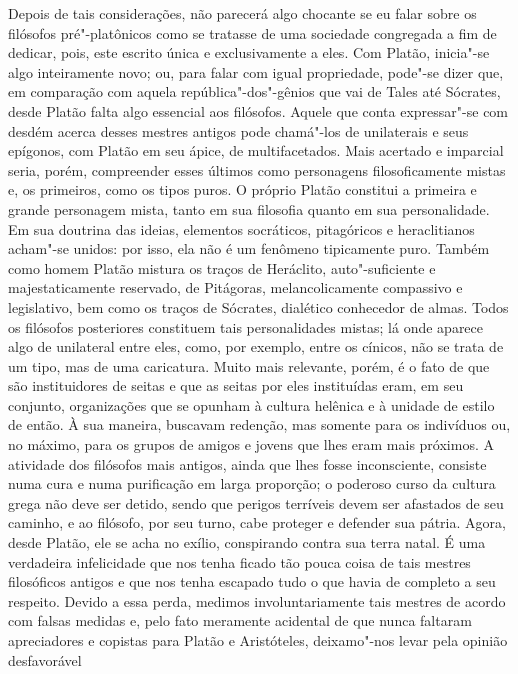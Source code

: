 Depois de tais considerações, não parecerá algo chocante se eu falar
sobre os filósofos pré"-platônicos como se tratasse de uma sociedade
congregada a fim de dedicar, pois, este escrito única e exclusivamente
a eles. Com Platão, inicia"-se algo inteiramente novo; ou, para falar \label{complatao}
com igual propriedade, pode"-se dizer que, em comparação com aquela
república"-dos"-gênios que vai de Tales até Sócrates, desde Platão falta
algo essencial aos filósofos. Aquele que conta expressar"-se com desdém
acerca desses mestres antigos pode chamá"-los de unilaterais e seus
epígonos, com Platão em seu ápice, de multifacetados. Mais acertado e
imparcial seria, porém, compreender esses últimos como personagens
filosoficamente mistas e, os primeiros, como os tipos puros. O próprio
Platão constitui a primeira e grande personagem mista, tanto em sua
filosofia quanto em sua personalidade. Em sua doutrina das ideias,
elementos socráticos, pitagóricos e heraclitianos acham"-se unidos: por
isso, ela não é um fenômeno tipicamente puro. Também como homem Platão
mistura os traços de Heráclito, auto"-suficiente e majestaticamente
reservado, de Pitágoras, melancolicamente compassivo e legislativo, bem
como os traços de Sócrates, dialético conhecedor de almas. Todos os
filósofos posteriores constituem tais personalidades mistas; lá onde
aparece algo de unilateral entre eles, como, por exemplo, entre os
cínicos, não se trata de um tipo, mas de uma caricatura. Muito
mais relevante, porém, é o fato de que são instituidores de seitas e
que as seitas por eles instituídas eram, em seu conjunto, organizações
que se opunham à cultura helênica e à unidade de estilo de então. À sua
maneira, buscavam redenção, mas somente para os indivíduos ou, no
máximo, para os grupos de amigos e jovens que lhes eram mais próximos.
A atividade dos filósofos mais antigos, ainda que lhes fosse
inconsciente, consiste numa cura e numa purificação em larga proporção;
o poderoso curso da cultura grega não deve ser detido, sendo que
perigos terríveis devem ser afastados de seu caminho, e ao filósofo, por
seu turno, cabe proteger e defender sua pátria. Agora, desde Platão,
ele se acha no exílio, conspirando contra sua terra natal. É uma
verdadeira infelicidade que nos tenha ficado tão pouca coisa de
tais mestres filosóficos antigos e que nos tenha escapado tudo o que
havia de completo a seu respeito. Devido a essa perda, medimos
involuntariamente tais mestres de acordo com falsas medidas e, pelo
fato meramente acidental de que nunca faltaram apreciadores e copistas
para Platão e Aristóteles, deixamo"-nos levar pela opinião desfavorável

